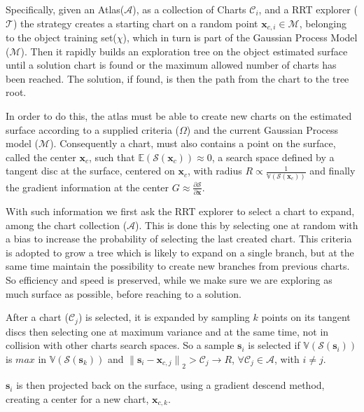 Specifically, given an Atlas($\mathcal{A}$), as a collection of Charts $\mathcal{C}_{i}$,
and a RRT explorer ($\mathcal{T}$) the strategy creates a starting chart on a
random point $\mathbf{x}_{c,i} \in \mathcal{M}$, belonging to the object training set($\chi$),
which in turn is part of the Gaussian Process Model ($\mathcal{M}$).
Then it rapidly builds an exploration tree on the object estimated surface until a solution
chart is found or the maximum allowed number of charts has been reached.
The solution, if found, is then the path from the chart to the tree root.

In order to do this, the atlas must be able to create new charts on the estimated surface
according to a supplied criteria ($\Omega$) and the current Gaussian Process model ($\mathcal{M}$).
Consequently a chart, must also contains a point on the surface, called the center $\mathbf{x}_c$,
such that $\mathbb{E}(\mathcal{S}(\mathbf{x}_c)) \approx 0$, a search space defined by a
tangent disc at the surface, centered on $\mathbf{x}_c$, with radius $R \propto \frac{1}{\mathbb{V}(\mathcal{S}(\mathbf{x}_c))}$ 
and finally the gradient information at the center $G \approx \frac{\partial \mathcal{S}}{\partial \mathbf{x}}$.

With such information we first ask the RRT explorer to select a chart to expand,
among the chart collection ($\mathcal{A}$).
This is done this by selecting one at random with a bias to increase the probability
of selecting the last created chart. This criteria is adopted to grow a tree
which is likely to expand on a single branch, but at the same time maintain the
possibility to create new branches from previous charts. So efficiency and speed
is preserved, while we make sure we are exploring as much surface as possible,
before reaching to a solution.

After a chart ($\mathcal{C}_j$) is selected, it is expanded by 
sampling $k$ points on its tangent discs then selecting one at maximum variance
and at the same time, not in collision with other charts search spaces. 
So a sample $\mathbf{s}_i$ is selected if $\mathbb{V}(\mathcal{S}(\mathbf{s}_i))$ is $\mathit{max}$ in $\mathbb{V}(\mathcal{S}(\mathbf{s}_k))$
and ${\parallel\mathbf{s}_i - \mathbf{x}_{c,j}\parallel}_{2} > \mathcal{C}_j \rightarrow R$, $\forall \mathcal{C}_j \in \mathcal{A}$, with $i \ne j$.

$\mathbf{s}_i$ is then projected back on the surface, using a gradient descend method,
creating a center for a new chart, $\mathbf{x}_{c,k}$.


